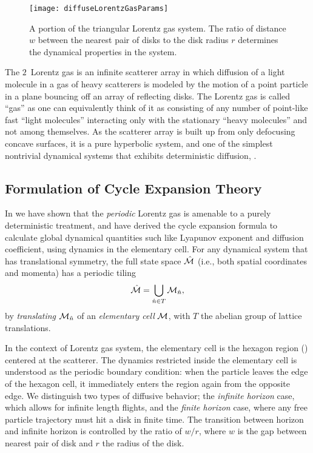 \documentclass[aps,pre,showpacs,preprint,groupedaddress,floatfix]{revtex4-1}
\begin{document}
\begin{figure}[htbp]
  \begin{center}

    \texttt{[image: diffuseLorentzGasParams]}

  \end{center}
  \caption[]{\label{fig-schrieberFig1} A portion of the triangular
    Lorentz gas system. The ratio of distance $w$ between the nearest
    pair of disks to the disk radius $r$ determines the dynamical
    properties in the system.}

\end{figure}

The $2$\dmn\ Lorentz gas is an infinite scatterer array in which
diffusion of a light molecule in a gas of heavy scatterers is modeled
by the motion of a point particle in a plane bouncing off an array of
reflecting disks. The Lorentz gas is called ``gas'' as one can
equivalently think of it as consisting of any number of point-like
fast ``light molecules'' interacting only with the stationary ``heavy
molecules'' and not among themselves.  As the scatterer array is built
up from only defocusing concave surfaces, it is a pure hyperbolic
system, and one of the simplest nontrivial dynamical systems that
exhibits deterministic diffusion, .

\subsection{Formulation of Cycle Expansion Theory}
In  we have shown that the {\em periodic} Lorentz gas is
amenable to a purely deterministic treatment, and have derived the
cycle expansion formula to calculate global dynamical quantities such
like Lyapunov exponent and diffusion coefficient, using dynamics in
the elementary cell. For any dynamical system that has translational
symmetry, the full state space $\hat {{\cal M}}$ (i.e., both spatial coordinates
and momenta) has a periodic tiling \[\hat {{\cal M}}=\bigcup_{ \hat n \in T}
{\cal M}_{\hat n},\] by {\em translating} ${\cal M}_{\hat n}$ of an {\em elementary
  cell} ${\cal M}$, with $T$ the abelian group of lattice translations.

In the context of Lorentz gas system, the elementary cell is the
hexagon region () centered at the
scatterer. The dynamics restricted inside the elementary cell is
understood as the periodic boundary condition: when the particle
leaves the edge of the hexagon cell, it immediately enters the region
again from the opposite edge. We distinguish two types of diffusive
behavior; the {\em infinite horizon} case, which allows for infinite
length flights, and the {\em finite horizon} case, where any free
particle trajectory must hit a disk in finite time. The transition
between horizon and infinite horizon is controlled by the ratio of
$w/r$, where $w$ is the gap between nearest pair of disk and $r$ the
radius of the disk.
\end{document}
